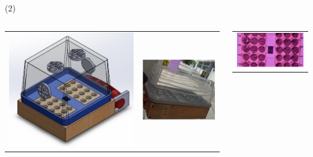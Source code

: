 \begin{frame}{\citetitle{\EntradaBibtex} (2)}

\begin{columns}


\begin{center}
	\begin{tabular}{cc}
		\includegraphics[width=0.5\linewidth]{2024_GerminadorAutomatico/figs/PrototipoGerminador.png}&
		\includegraphics[width=0.5\linewidth]{2024_GerminadorAutomatico/figs/GerminadorFinal.png} \\
	\end{tabular}
\end{center}
	\begin{tabular}{c}
		\includegraphics[width=0.9\linewidth]{2024_GerminadorAutomatico/figs/SemillasenGerminador.png} \\

\end{tabular}
\end{columns}
\end{frame}
